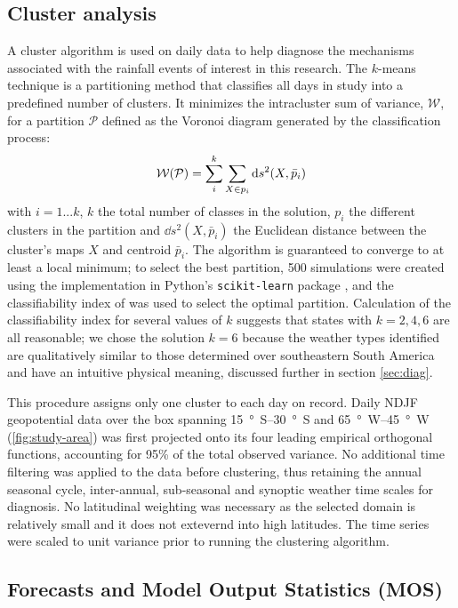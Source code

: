 \documentclass[twocol]{ametsoc}
\begin{document}
\subsection{Cluster analysis}

A cluster algorithm is used on daily data to help diagnose the mechanisms associated with the rainfall events of interest in this research.
The $k$-means technique is a partitioning method that classifies all days in study into a predefined number of clusters.
It minimizes the intracluster sum of variance, $\mathcal{W}$, for a partition $\mathcal{P}$ defined as the Voronoi diagram generated by the classification process:
\begin{equation}
	\mathcal{W} \qty( \mathcal{P} ) = \sum_{i}^{k}\sum_{X\in p_{i}} \dd s^{2} \qty(X,\bar{p}_{i})
\end{equation}
with $i=1...k$,  $k$ the total number of classes in the solution, $p_i$ the different clusters in the partition and $\dd s^2(X,\bar{p}_i)$ the Euclidean distance between the cluster's maps $X$ and centroid $\bar{p}_i$.
The algorithm is guaranteed to converge to at least a local minimum; to select the best partition, 500 simulations were created using the implementation in Python's \texttt{scikit-learn} package \citep{Pedregosa:2012tv}, and the classifiability index of \citet{Michelangeli1995} was used to select the optimal partition.
Calculation of the classifiability index for several values of $k$ suggests that states with $k=2,4,6$ are all reasonable; we chose the solution $k=6$ because the weather types identified are qualitatively similar to those determined over southeastern South America \citep{Munoz2015,Munoz2016} and have an intuitive physical meaning, discussed further in section \ref{sec:diag}.

This procedure assigns only one cluster to each day on record.
Daily NDJF geopotential data over the box spanning \SIrange{15}{30}{\degree S} and \SIrange{65}{45}{\degree W} (\cref{fig:study-area}) was first projected onto its four leading empirical orthogonal functions, accounting for 95\% of the total observed variance.
No additional time filtering was applied to the data before clustering, thus retaining the annual seasonal cycle, inter-annual, sub-seasonal and synoptic weather time scales for diagnosis.
No latitudinal weighting was necessary as the selected domain is relatively small and it does not extevernd into high latitudes.
The time series were scaled to unit variance prior to running the clustering algorithm.

\subsection{Forecasts and Model Output Statistics (MOS)}
\end{document}
